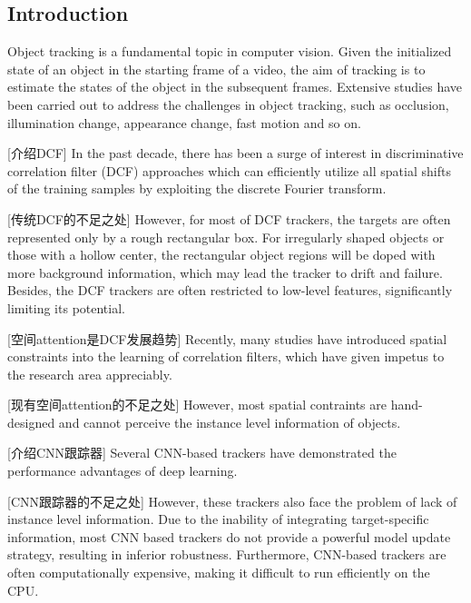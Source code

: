 \documentclass[review]{elsarticle}
\begin{document}
\begin{CJK*}{UTF8}{gbsn}

\section{Introduction}
Object tracking is a fundamental topic in computer vision. Given the initialized state of an object in the starting frame of a video, the aim of tracking is to estimate the states of the object in the subsequent frames. Extensive studies \cite{Bolme2010VisualOT, Danelljan2014AccurateSE, Henriques2015HighSpeedTW, Li2014ASA, Nam2016LearningMC, Danelljan2015ConvolutionalFF, Wang2018SiamMask} have been carried out to address the challenges in object tracking, such as occlusion, illumination change, appearance change, fast motion and so on. 

[介绍DCF] In the past decade, there has been a surge of interest in discriminative correlation filter (DCF) approaches \cite{Bolme2010VisualOT, Danelljan2014AccurateSE, Henriques2015HighSpeedTW, Li2014ASA} which can efficiently utilize all spatial shifts of the training samples by exploiting the discrete Fourier transform. 

[传统DCF的不足之处] However, for most of DCF trackers, the targets are often represented only by a rough rectangular box. For irregularly shaped objects or those with a hollow center, the rectangular object regions will be doped with more background information, which may lead the tracker to drift and failure. Besides, the DCF trackers are often restricted to low-level features, significantly limiting its potential.

[空间attention是DCF发展趋势] Recently, many studies \cite{Danelljan2015LearningSR, Lukezic2017DiscriminativeCF, Galoogahi2017LearningBC, Xu2018LearningAD, Feng2018LearningSR} have introduced spatial constraints into the learning of correlation filters, which have given impetus to the research area appreciably.

[现有空间attention的不足之处] However, most spatial contraints are hand-designed and cannot perceive the instance level information of objects.

[介绍CNN跟踪器] Several CNN-based trackers \cite{Nam2016LearningMC, Danelljan2015ConvolutionalFF} have demonstrated the performance advantages of deep learning.

[CNN跟踪器的不足之处] However, these trackers also face the problem of lack of instance level information. Due to the inability of integrating target-specific information, most CNN based trackers do not provide a powerful model update strategy, resulting in inferior robustness. Furthermore, CNN-based trackers are often computationally expensive, making it difficult to run efficiently on the CPU. 


\end{CJK*}
\end{document}
